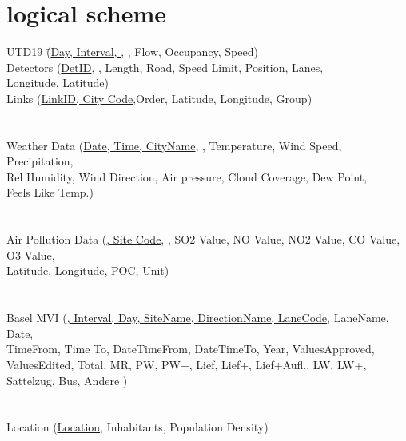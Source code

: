\documentclass{article}
\begin{document}
\section{logical scheme}
\begin{center}
\begin{tabbing}
    UTD19 \qquad\qquad\qquad\= (\uline{Day, Interval, }, , Flow, Occupancy, Speed)\\
    
    Detectors \> (\uline{DetID}, , Length, Road, Speed Limit, Position, Lanes,\\ \> Longitude, Latitude)\\

    Links \> (\uline{LinkID, City Code},Order, Latitude, Longitude, Group)\\\\\\
    

    
    Weather Data \> (\uline{Date, Time, CityName},  , Temperature, Wind Speed, Precipitation,\\ \> Rel Humidity, Wind Direction, Air pressure, Cloud Coverage, Dew Point,\\ \> Feels Like Temp.)\\\\\\%

  
    
    Air Pollution Data \> (\uline{, Site Code}, ,  SO2 Value, NO Value, NO2 Value, CO Value, O3 Value,\\ \> Latitude, Longitude, POC, Unit)\\\\\\
    
    
    Basel MVI \> (\uline{, Interval, Day, SiteName, DirectionName, LaneCode}, LaneName, Date,\\ \> TimeFrom, Time To, DateTimeFrom, DateTimeTo, Year, ValuesApproved,\\ \> ValuesEdited, Total, MR, PW, PW+, Lief, Lief+, Lief+Aufl., LW, LW+,\\ \> Sattelzug, Bus, Andere )\\\\\\
    
    Location \> (\uline{Location}, Inhabitants, Population Density)
    
\end{tabbing}    
\end{center}
\end{document}
